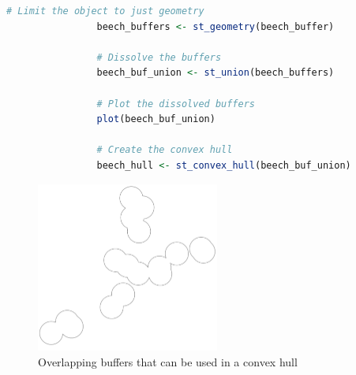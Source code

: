 \documentclass{article}
\begin{document}
\begin{itemize}
\begin{itemize}
\begin{itemize}
\begin{lstlisting}[language=R]
                # Limit the object to just geometry
                beech_buffers <- st_geometry(beech_buffer)

                # Dissolve the buffers
                beech_buf_union <- st_union(beech_buffers)

                # Plot the dissolved buffers
                plot(beech_buf_union)

                # Create the convex hull
                beech_hull <- st_convex_hull(beech_buf_union)
            \end{lstlisting}

            \begin{figure}[h]
                \centering
                \caption{Overlapping buffers that can be used in a convex hull}
                \label{convex hull buffer}
                \includegraphics[width=6cm]{convex-hull-buffer.png}
            \end{figure} 


\end{itemize}
\end{itemize}
\end{itemize}
\end{document}
